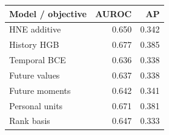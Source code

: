 \begin{tabular}{lrr}
\toprule
Model / objective & AUROC & AP \\
\midrule
HNE additive & 0.650 & 0.342 \\
History HGB & 0.677 & 0.385 \\
Temporal BCE & 0.636 & 0.338 \\
Future values & 0.637 & 0.338 \\
Future moments & 0.642 & 0.341 \\
Personal units & 0.671 & 0.381 \\
Rank basis & 0.647 & 0.333 \\
\bottomrule
\end{tabular}